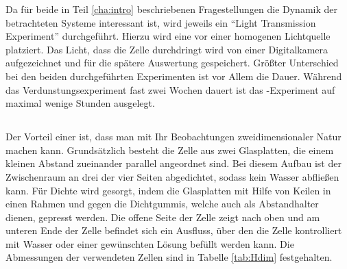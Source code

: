 \label{cha:set}


Da für beide in Teil \ref{cha:intro} beschriebenen Fragestellungen die Dynamik der betrachteten Systeme interessant ist, wird jeweils ein ``Light Transmission Experiment''
durchgeführt. Hierzu wird eine \HSC vor einer homogenen Lichtquelle platziert. Das Licht, dass die Zelle durchdringt wird von einer Digitalkamera aufgezeichnet und für die spätere Auswertung gespeichert.
Größter Unterschied bei den beiden durchgeführten Experimenten ist vor Allem die Dauer. Während das Verdunstungsexperiment fast zwei Wochen dauert ist das \COT-Experiment auf maximal wenige Stunden ausgelegt. 

\subsection{\HSC}
\label{sec:hsc}
Der Vorteil einer \HSC ist, dass man mit Ihr Beobachtungen zweidimensionaler Natur machen kann.
Grundsätzlich besteht die Zelle aus zwei Glasplatten, die einem kleinen Abstand zueinander parallel angeordnet sind. Bei diesem Aufbau ist der Zwischenraum an drei der vier Seiten abgedichtet, sodass kein Wasser abfließen kann. Für Dichte wird gesorgt, indem die Glasplatten mit Hilfe von Keilen in einen Rahmen und gegen die Dichtgummis, welche auch als Abstandhalter dienen, gepresst werden. 
Die offene Seite der Zelle zeigt nach oben und am unteren Ende der Zelle befindet sich ein Ausfluss, über den die Zelle kontrolliert mit Wasser oder einer gewünschten Lösung befüllt werden kann.
Die Abmessungen der verwendeten Zellen sind in Tabelle \ref{tab:Hdim} festgehalten.


